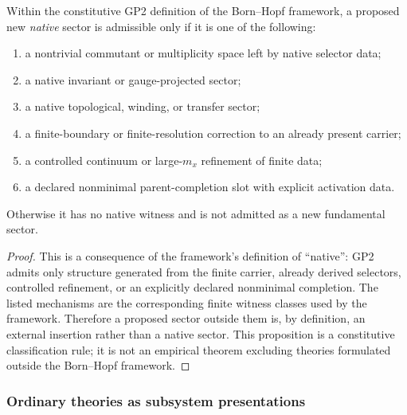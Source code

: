 \documentclass[12pt,a4paper]{article}
\begin{document}
\begin{proposition}
\label{p12:prop:gp2-filter-new-sectors}
Within the constitutive GP2 definition of the Born--Hopf framework, a proposed new \emph{native} sector is admissible only if it is one of the following:
\begin{enumerate}[label=(\alph*), leftmargin=2em]
\item a nontrivial commutant or multiplicity space left by native selector data;
\item a native invariant or gauge-projected sector;
\item a native topological, winding, or transfer sector;
\item a finite-boundary or finite-resolution correction to an already present carrier;
\item a controlled continuum or large-\(m_x\) refinement of finite data;
\item a declared nonminimal parent-completion slot with explicit activation data.
\end{enumerate}
Otherwise it has no native witness and is not admitted as a new fundamental sector.
\end{proposition}
\begin{proof}
This is a consequence of the framework's definition of ``native'': GP2 admits only structure generated from the finite carrier, already derived selectors, controlled refinement, or an explicitly declared nonminimal completion.  The listed mechanisms are the corresponding finite witness classes used by the framework.  Therefore a proposed sector outside them is, by definition, an external insertion rather than a native sector.  This proposition is a constitutive classification rule; it is not an empirical theorem excluding theories formulated outside the Born--Hopf framework.
\end{proof}


\subsubsection{Ordinary theories as subsystem presentations}
\end{document}
